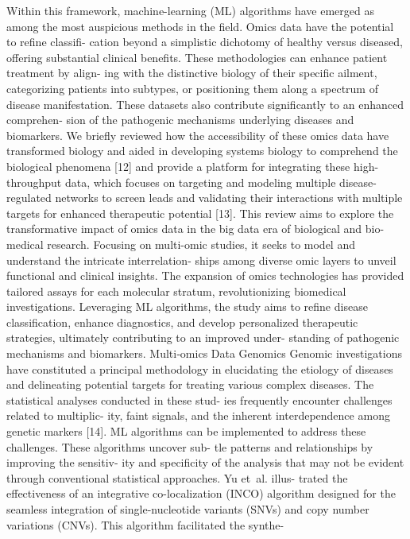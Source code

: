 Within this framework, machine-learning (ML) algorithms
have emerged as among the most auspicious methods in
the field. Omics data have the potential to refine classifi-
cation beyond a simplistic dichotomy of healthy versus
diseased, offering substantial clinical benefits. These
methodologies can enhance patient treatment by align-
ing with the distinctive biology of their specific ailment,
categorizing patients into subtypes, or positioning them
along a spectrum of disease manifestation. These datasets
also contribute significantly to an enhanced comprehen-
sion of the pathogenic mechanisms underlying diseases
and biomarkers. We briefly reviewed how the accessibility
of these omics data have transformed biology and aided in
developing systems biology to comprehend the biological
phenomena [12] and provide a platform for integrating
these high-throughput data, which focuses on targeting and
modeling multiple disease-regulated networks to screen
leads and validating their interactions with multiple targets
for enhanced therapeutic potential [13].
This review aims to explore the transformative impact
of omics data in the big data era of biological and bio-
medical research. Focusing on multi-omic studies, it
seeks to model and understand the intricate interrelation-
ships among diverse omic layers to unveil functional and
clinical insights. The expansion of omics technologies
has provided tailored assays for each molecular stratum,
revolutionizing biomedical investigations. Leveraging ML
algorithms, the study aims to refine disease classification,
enhance diagnostics, and develop personalized therapeutic
strategies, ultimately contributing to an improved under-
standing of pathogenic mechanisms and biomarkers.
Multi‑omics Data
Genomics
Genomic investigations have constituted a principal
methodology in elucidating the etiology of diseases and
delineating potential targets for treating various complex
diseases. The statistical analyses conducted in these stud-
ies frequently encounter challenges related to multiplic-
ity, faint signals, and the inherent interdependence among
genetic markers [14]. ML algorithms can be implemented
to address these challenges. These algorithms uncover sub-
tle patterns and relationships by improving the sensitiv-
ity and specificity of the analysis that may not be evident
through conventional statistical approaches. Yu et al. illus-
trated the effectiveness of an integrative co-localization
(INCO) algorithm designed for the seamless integration
of single-nucleotide variants (SNVs) and copy number
variations (CNVs). This algorithm facilitated the synthe-
